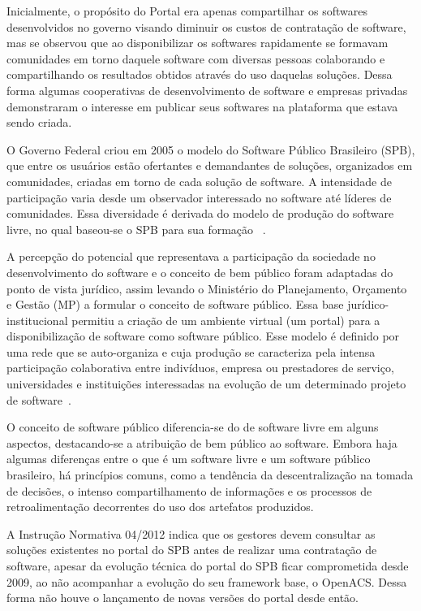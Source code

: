 Inicialmente, o propósito do Portal era apenas compartilhar os softwares desenvolvidos
no governo visando diminuir os custos de contratação de software, mas se observou
que ao disponibilizar os softwares rapidamente se formavam comunidades em torno 
daquele software com diversas pessoas colaborando e compartilhando os resultados
obtidos através do uso daquelas soluções. Dessa forma algumas cooperativas de 
desenvolvimento de software e empresas privadas demonstraram o interesse em
publicar seus softwares na plataforma que estava sendo criada.

O Governo Federal criou em 2005 o modelo do Software
Público Brasileiro (SPB), que entre os usuários estão ofertantes e demandantes de soluções, 
organizados em comunidades, criadas em torno de cada solução de software. A intensidade de participação
varia desde um observador interessado no software até líderes de comunidades. Essa diversidade é
derivada do modelo de produção do software livre, no qual baseou-se o SPB para sua formação
~\cite{alves2009software}. 

A percepção do potencial que representava a participação da sociedade no desenvolvimento do software
e o conceito de bem público foram adaptadas do ponto de vista jurídico, assim levando o Ministério
do Planejamento, Orçamento e Gestão (MP) a formular o conceito de software público. Essa base
jurídico-institucional permitiu a criação de um ambiente virtual (um portal) para a disponibilização
de software como software público. Esse modelo é definido por uma rede que se auto-organiza e cuja
produção se caracteriza pela intensa participação colaborativa entre indivíduos, empresa ou 
prestadores de serviço, universidades e instituições interessadas na evolução de um determinado projeto
de software~\cite{alves2009software}.

O conceito de software público diferencia-se do de software livre em alguns aspectos, destacando-se
a atribuição de bem público ao software. Embora haja algumas diferenças entre o que é um software
livre e um software público brasileiro, há princípios comuns, como a tendência da descentralização na
tomada de decisões, o intenso compartilhamento de informações e os processos de retroalimentação
decorrentes do uso dos artefatos produzidos. 

A Instrução Normativa 04/2012 indica que os gestores devem consultar as soluções 
existentes no portal do SPB antes de realizar uma contratação de software, apesar da
evolução técnica do portal do SPB ficar comprometida desde 2009, ao não acompanhar 
a evolução do seu framework base, o OpenACS. Dessa forma não houve o lançamento de novas versões do
portal desde então\cite{softwarepublico}.


